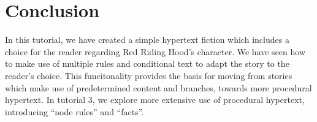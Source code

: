 \documentclass{article}
\begin{document}
\section{Conclusion}

In this tutorial, we have created a simple hypertext fiction which includes a
choice for the reader regarding Red Riding Hood's character. We have seen how
to make use of multiple rules and conditional text to adapt the story to the
reader's choice. This funcitonality provides the basis for moving from stories
which make use of predetermined content and branches, towards more procedural
hypertext. In tutorial 3, we explore more extensive use of procedural
hypertext, introducing ``node rules'' and ``facts''.
\end{document}
